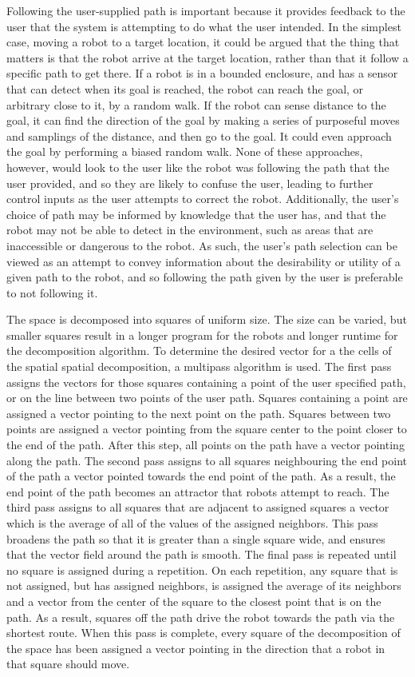 Following the user-supplied path is important because it provides feedback to the user that the system is attempting to do what the user intended. 
In the simplest case, moving a robot to a target location, it could be argued that the thing that matters is that the robot arrive at the target location, rather than that it follow a specific path to get there. 
If a robot is in a bounded enclosure, and has a sensor that can detect when its goal is reached, the robot can reach the goal, or arbitrary close to it, by a random walk. 
If the robot can sense distance to the goal, it can find the direction of the goal by making a series of purposeful moves and samplings of the distance, and then go to the goal.
It could even approach the goal by performing a biased random walk. 
None of these approaches, however, would look to the user like the robot was following the path that the user provided, and so they are likely to confuse the user, leading to further control inputs as the user attempts to correct the robot. 
Additionally, the user's choice of path may be informed by knowledge that the user has, and that the robot may not be able to detect in the environment, such as areas that are inaccessible or dangerous to the robot. 
As such, the user's path selection can be viewed as an attempt to convey information about the desirability or utility of a given path to the robot, and so following the path given by the user is preferable to not following it. 

The space is decomposed into squares of uniform size. The size can be varied, but smaller squares result in a longer program for the robots and longer runtime for the decomposition algorithm. 
To determine the desired vector for a the cells of the spatial spatial decomposition, a multipass algorithm is used. 
The first pass assigns the vectors for those squares containing a point of the user specified path, or on the line between two points of the user path. 
Squares containing a point are assigned a vector pointing to the next point on the path. 
Squares between two points are assigned a vector pointing from the square center to the point closer to the end of the path. 
After this step, all points on the path have a vector pointing along the path. 
The second pass assigns to all squares neighbouring the end point of the path a vector pointed towards the end point of the path. 
As a result, the end point of the path becomes an attractor that robots attempt to reach. 
The third pass assigns to all squares that are adjacent to assigned squares a vector which is the average of all of the values of the assigned neighbors. 
This pass broadens the path so that it is greater than a single square wide, and ensures that the vector field around the path is smooth. 
The final pass is repeated until no square is assigned during a repetition. 
On each repetition, any square that is not assigned, but has assigned neighbors, is assigned the average of its neighbors and a vector from the center of the square to the closest point that is on the path. 
As a result, squares off the path drive the robot towards the path via the shortest route. 
When this pass is complete, every square of the decomposition of the space has been assigned a vector pointing in the direction that a robot in that square should move. 


